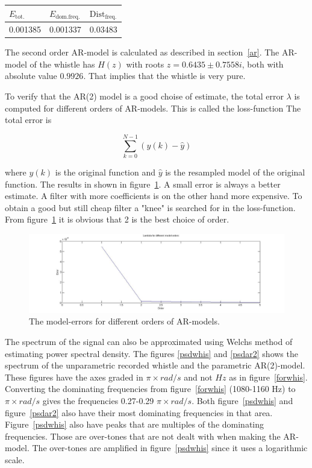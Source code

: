 \documentclass[12pt]{article}
\begin{document}
\begin{center}
\begin{tabular}{l|l|l}
  \hline
  $E_{\mathrm{tot.}}$ &  $E_{\mathrm{dom. freq.}}$ & $\mathrm{Dist}_{\mathrm{freq.}}$ \\
  \hline
  0.001385 & 0.001337 & 0.03483
\end{tabular}
\end{center}


The second order AR-model is calculated as described in section~\ref{ar}.  The AR-model of the whistle has $H(z)$ with roots $z=0.6435 \pm 0.7558i$, both with absolute value $0.9926$. That implies that the whistle is very pure. 

To verify that the AR(2) model is a good choise of estimate, the total error $\lambda$ is computed for different orders of AR-models. This is called the loss-function The total error is 

\[
  \sum_{k=0}^{N-1}(y(k)-\hat{y})
\]

where $y(k)$ is the original function and $\hat{y}$ is the resampled model of the original function.  The results in shown in figure~\ref{whisknee}. A small error is always  a better estimate. A filter with more coefficients is on the other hand more expensive. To obtain a good but still cheap filter a "knee" is searched for in the loss-function. From figure~\ref{whisknee} it is obvious that 2 is the best choice of order.   

\begin{figure}[H]
\centering
\includegraphics[width=14cm]{whistleknee.jpg}
\caption{The model-errors for different orders of AR-models.\label{whisknee}}
\end{figure}

The spectrum of the signal can also be approximated using Welchs method of estimating power spectral density.
The figures \ref{psdwhis} and \ref{psdar2} shows the spectrum of the unparametric recorded whistle and the parametric AR(2)-model.
These figures have the axes graded in $\pi \times rad/s$ and not $Hz$ as in figure~\ref{forwhis}.
Converting the dominating frequencies from figure~\ref{forwhis} (1080-1160 Hz) to $\pi \times rad/s$ gives the frequencies 0.27-0.29 $\pi \times rad/s$.
Both figure~\ref{psdwhis} and figure~\ref{psdar2} also have their most dominating frequencies in that area.
Figure~\ref{psdwhis} also have peaks that are multiples of the dominating frequencies.
Those are over-tones that are not dealt with when making the AR-model.
The over-tones are amplified in figure~\ref{psdwhis} since it uses a logarithmic scale. 
\end{document}
